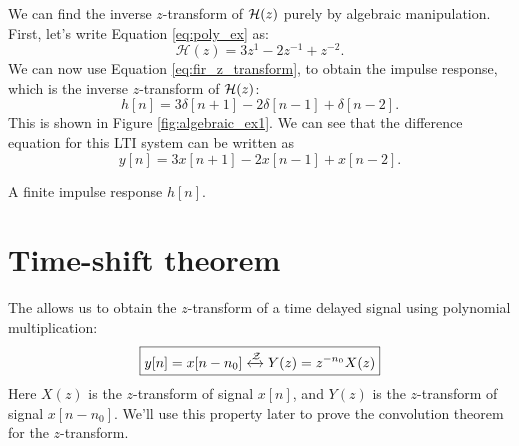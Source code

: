 \noindent We can find the inverse $z$-transform of $\mathcal{H}(z)$ purely by algebraic
manipulation. First, let's write Equation \ref{eq:poly_ex} as:
\begin{equation}
  \mathcal{H}(z) = 3z^{1} - 2z^{-1}  + z^{-2}.
\end{equation}
We can now use Equation \ref{eq:fir_z_transform}, to obtain the impulse
response, which is the inverse $z$-transform of $\mathcal{H}(z)$:
\begin{equation}
h[n] = 3\delta[n+1] - 2\delta[n-1] + \delta[n-2].
\end{equation}
This is shown in Figure \ref{fig:algebraic_ex1}. We can see that the
difference equation for this LTI system can be written as
\begin{equation}
y[n] = 3x[n+1]-2x[n-1]+ x[n-2].
\end{equation}
\begin{marginfigure}
\begin{center}
\end{center}
\caption{A finite impulse response $h[n]$.}
\label{fig:algebraic_ex1}
\end{marginfigure}


\section{Time-shift theorem}
The  allows us to obtain
the $z$-transform of a time delayed signal using polynomial multiplication:
\begin{equation}
  \boxed{
    y[n] = x[n-n_0] \xleftrightarrow{\mathcal{Z}} Y(z) = z^{-n_0}X(z)
    }
\end{equation}
Here $X(z)$ is the $z$-transform of signal $x[n]$, and $Y(z)$ is the
$z$-transform of signal $x[n-n_0]$. We'll use this property later to
prove the convolution theorem for the $z$-transform.

